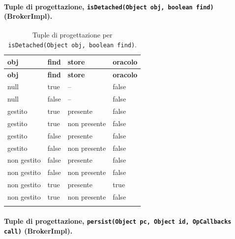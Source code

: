 \paragraph*{Tuple di progettazione, \texttt{isDetached(Object obj, boolean find)} (BrokerImpl).}

{\footnotesize\setlength{\tabcolsep}{3pt}
\begin{longtable}{>{\raggedright\arraybackslash}p{}>{\raggedright\arraybackslash}p{}>{\raggedright\arraybackslash}p{}>{\raggedright\arraybackslash}p{}}
\toprule
\textbf{obj} & \textbf{find} & \textbf{store} & \textbf{oracolo} \\
\midrule
\endfirsthead
\toprule
\textbf{obj} & \textbf{find} & \textbf{store} & \textbf{oracolo} \\
\midrule
\endhead
\bottomrule
\endfoot
null & true & -- & false \\
null & false & -- & false \\
gestito & true & presente & false \\
gestito & true & non presente & false \\
gestito & false & presente & false \\
gestito & false & non presente & false \\
non gestito & false & presente & false \\
non gestito & false & non presente & false \\
non gestito & true & presente & true \\
non gestito & true & non presente & false \\
\bottomrule
\caption{Tuple di progettazione per \texttt{isDetached(Object obj, boolean find)}.}
\label{tab:isdetached-tuple}
\end{longtable}
}



\paragraph*{Tuple di progettazione, \texttt{persist(Object pc, Object id, OpCallbacks call)} (BrokerImpl).}

